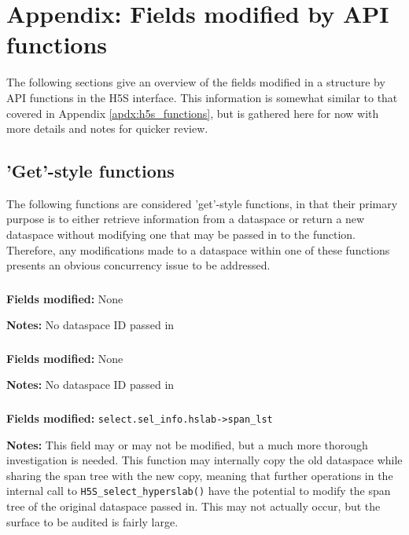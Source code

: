 \documentclass[../HDF5_RFC.tex]{subfiles}
\begin{document}
\newpage

\section{Appendix: Fields modified by API functions}
\label{apdx:h5s_fields_modified}

The following sections give an overview of the fields modified in a 
structure by API functions in the H5S interface. This information is somewhat similar to that covered
in Appendix \ref{apdx:h5s_functions}, but is gathered here for now with more details and notes for
quicker review.

\subsection{'Get'-style functions}

The following functions are considered 'get'-style functions, in that their primary purpose is
to either retrieve information from a dataspace or return a new dataspace without modifying one
that may be passed in to the function. Therefore, any modifications made to a dataspace within
one of these functions presents an obvious concurrency issue to be addressed.

\subsubsection{}

\textbf{Fields modified:} None

\textbf{Notes:} No dataspace ID passed in

\subsubsection{}

\textbf{Fields modified:} None

\textbf{Notes:} No dataspace ID passed in

\subsubsection{}

\textbf{Fields modified:} \texttt{select.sel\_info.hslab->span\_lst}

\textbf{Notes:} This field may or may not be modified, but a much more thorough investigation is needed.
This function may internally copy the old dataspace while sharing the span tree with the new copy,
meaning that further operations in the internal call to \texttt{H5S\_select\_hyperslab()} have the
potential to modify the span tree of the original dataspace passed in. This may not actually occur, but
the surface to be audited is fairly large.
\end{document}
